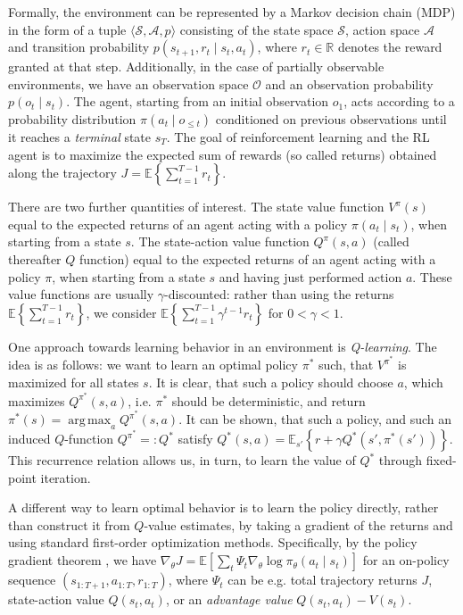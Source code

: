 \documentclass[en]{pracamgr}
\DeclareMathOperator*{\argmax}{arg\,max}
\begin{document}
Formally, the environment can be represented by a Markov decision chain (MDP) in the form of a tuple $\langle \mathcal{S}, \mathcal{A}, p \rangle$ consisting of the state space $\mathcal{S}$, action space $\mathcal{A}$ and transition probability $p(s_{t+1}, r_{t} \mid s_t, a_t)$, where $r_t \in \mathbb{R}$ denotes the reward granted at that step. Additionally, in the case of partially observable environments, we have an observation space $\mathcal{O}$ and an observation probability $p(o_t \mid s_t)$. The agent, starting from an initial observation $o_1$, acts according to a probability distribution $\pi(a_t \mid o_{\leq t})$ conditioned on previous observations until it reaches a \emph{terminal} state $s_T$. The goal of reinforcement learning and the RL agent is to maximize the expected sum of rewards (so called returns) obtained along the trajectory $J = \mathbb{E} \left\{\sum_{t=1}^{T-1} r_t\right\}$.

There are two further quantities of interest. The state value function $V^\pi(s)$ equal to the expected returns of an agent acting with a policy $\pi(a_t \mid s_t)$, when starting from a state $s$. The state-action value function $Q^\pi(s, a)$ (called thereafter $Q$ function) equal to the expected returns of an agent acting with a policy $\pi$, when starting from a state $s$ and having just performed action $a$. These value functions are usually $\gamma$-discounted: rather than using the returns $\mathbb{E} \left\{\sum_{t=1}^{T-1} r_t\right\}$, we consider $\mathbb{E} \left\{\sum_{t=1}^{T-1} \gamma^{t-1} r_t\right\}$ for $0 < \gamma < 1$.

One approach towards learning behavior in an environment is \emph{Q-learning}. The idea is as follows: we want to learn an optimal policy $\pi^*$ such, that $V^{\pi^*}$ is maximized for all states $s$. It is clear, that such a policy should choose $a$, which maximizes $Q^{\pi^*}(s, a)$, i.e. $\pi^*$ should be deterministic, and return $\pi^*(s) = \argmax_a Q^{\pi^*}(s, a)$. It can be shown, that such a policy, and such an induced $Q$-function $Q^{\pi^*} =: Q^*$ satisfy $Q^*(s, a) = \mathbb{E}_{s'} \left\{r + \gamma Q^*(s', \pi^*(s'))\right\}$. This recurrence relation allows us, in turn, to learn the value of $Q^*$ through fixed-point iteration.

A different way to learn optimal behavior is to learn the policy directly, rather than construct it from $Q$-value estimates, by taking a gradient of the returns and using standard first-order optimization methods. Specifically, by the policy gradient theorem \autocite{suttonPolicyGradientMethods1999}, we have $\nabla_\theta J = \mathbb{E}\left[\sum_t \Psi_t \nabla_\theta \log{\pi_\theta(a_t \mid s_t)}\right]$ for an on-policy sequence $(s_{1:T+1}, a_{1:T}, r_{1:T})$, where $\Psi_t$ can be e.g. total trajectory returns $J$, state-action value $Q(s_t, a_t)$, or an \emph{advantage value} $Q(s_t, a_t) - V(s_t)$.
\end{document}
